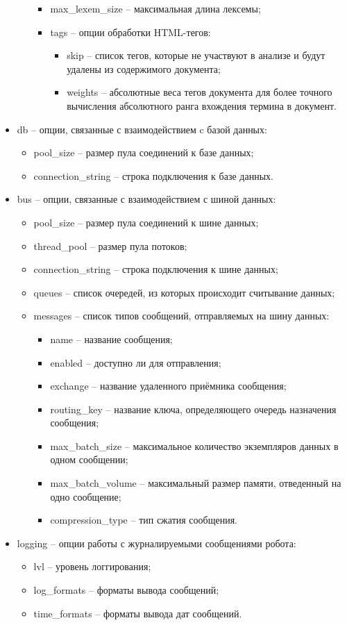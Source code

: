 \begin{itemize}
\begin{itemize}
\begin{itemize}
\item max\_lexem\_size -- максимальная длина лексемы;
\item tags -- опции обработки HTML-тегов:
\begin{itemize}
\item skip -- список тегов, которые не участвуют в анализе и будут удалены из содержимого документа;
\item weights -- абсолютные веса тегов документа для более точного вычисления абсолютного ранга вхождения термина в документ.
\end{itemize}
\end{itemize}
\end{itemize}
\item db -- опции, связанные с взаимодействием c базой данных:
\begin{itemize}
\item pool\_size -- размер пула соединений к базе данных;
\item connection\_string -- строка подключения к базе данных.
\end{itemize}
\item bus -- опции, связанные с взаимодействием с шиной данных:
\begin{itemize}
\item pool\_size -- размер пула соединений к шине данных;
\item thread\_pool -- размер пула потоков;
\item connection\_string -- строка подключения к шине данных;
\item queues -- список очередей, из которых происходит считывание данных;
\item messages -- список типов сообщений, отправляемых на шину данных:
\begin{itemize}
\item name -- название сообщения;
\item enabled -- доступно ли для отправления;
\item exchange -- название удаленного приёмника сообщения;
\item routing\_key -- название ключа, определяющего очередь назначения сообщения;
\item max\_batch\_size -- максимальное количество экземпляров данных в одном сообщении;
\item max\_batch\_volume -- максимальный размер памяти, отведенный на одно сообщение;
\item compression\_type -- тип сжатия сообщения.
\end{itemize}
\end{itemize}
\item logging -- опции работы с журналируемыми сообщениями робота:
\begin{itemize}
\item lvl -- уровень логгирования;
\item log\_formats -- форматы вывода сообщений;
\item time\_formats -- форматы вывода дат сообщений.
\end{itemize}
\end{itemize}


